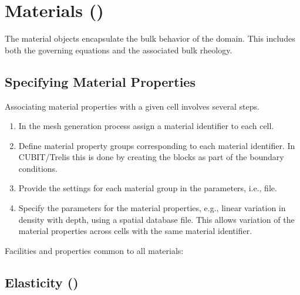\section{Materials (\protect{})}
\label{sec:materials}

The material objects encapsulate the bulk behavior of the domain. This
includes both the governing equations and the associated bulk rheology.

\subsection{Specifying Material Properties}

Associating material properties with a given cell involves several
steps.
\begin{enumerate}
  \item In the mesh generation process assign a material identifier to each
        cell.
  \item Define material property groups corresponding to each material
        identifier. In CUBIT/Trelis this is done by creating the blocks as
        part of the boundary conditions.
  \item Provide the settings for each material group in the parameters,
        i.e.,  file.
  \item Specify the parameters for the material properties, e.g., linear
        variation in density with depth, using a spatial database file. This
        allows variation of the material properties across cells with the
        same material identifier.
\end{enumerate}

Facilities and properties common to all materials:
\begin{inventory}
\end{inventory}


\subsection{Elasticity (\protect{})}

